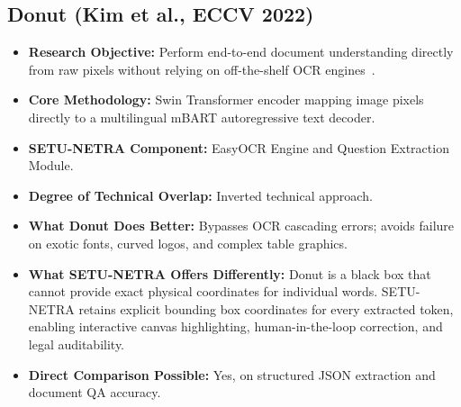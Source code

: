\documentclass[11pt,a4paper]{article}
\begin{document}
\subsection{Donut (Kim et al., ECCV 2022)}
\begin{itemize}[leftmargin=*]
    \item \textbf{Research Objective:} Perform end-to-end document understanding directly from raw pixels without relying on off-the-shelf OCR engines~\cite{Kim2022Donut}.
    \item \textbf{Core Methodology:} Swin Transformer encoder mapping image pixels directly to a multilingual mBART autoregressive text decoder.
    \item \textbf{SETU-NETRA Component:} EasyOCR Engine and Question Extraction Module.
    \item \textbf{Degree of Technical Overlap:} Inverted technical approach.
    \item \textbf{What Donut Does Better:} Bypasses OCR cascading errors; avoids failure on exotic fonts, curved logos, and complex table graphics.
    \item \textbf{What SETU-NETRA Offers Differently:} Donut is a black box that cannot provide exact physical coordinates for individual words. SETU-NETRA retains explicit bounding box coordinates for every extracted token, enabling interactive canvas highlighting, human-in-the-loop correction, and legal auditability.
    \item \textbf{Direct Comparison Possible:} Yes, on structured JSON extraction and document QA accuracy.
\end{itemize}

\end{document}
